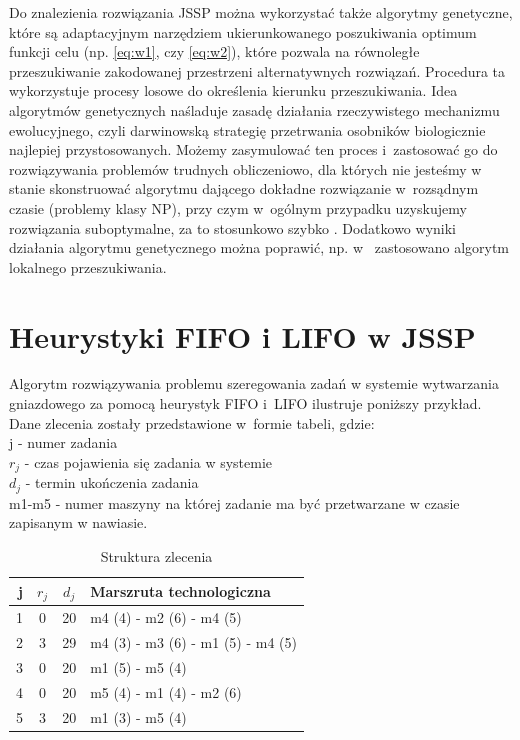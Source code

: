 \documentclass[twoside]{kInzynierka}
\begin{document}
Do znalezienia rozwiązania JSSP można wykorzystać także algorytmy genetyczne, które są adaptacyjnym narzędziem ukierunkowanego poszukiwania optimum funkcji celu (np. \eqref{eq:w1}, czy \eqref{eq:w2}), które pozwala na równoległe przeszukiwanie zakodowanej przestrzeni alternatywnych rozwiązań. Procedura ta wykorzystuje procesy losowe do określenia kierunku przeszukiwania. Idea algorytmów genetycznych naśladuje zasadę działania rzeczywistego mechanizmu ewolucyjnego, czyli darwinowską strategię przetrwania osobników biologicznie najlepiej przystosowanych. Możemy zasymulować ten proces i~zastosować go do rozwiązywania problemów trudnych obliczeniowo, dla których nie jesteśmy w stanie skonstruować algorytmu dającego dokładne rozwiązanie w~rozsądnym czasie (problemy klasy NP), przy czym w~ogólnym przypadku uzyskujemy rozwiązania suboptymalne, za to stosunkowo szybko \cite{grzechca}. Dodatkowo wyniki działania algorytmu genetycznego można poprawić, np. w~\cite{genetyczne} zastosowano algorytm lokalnego przeszukiwania.

\section        {Heurystyki FIFO i LIFO w JSSP}
Algorytm rozwiązywania problemu szeregowania zadań w systemie wytwarzania gniazdowego za pomocą heurystyk FIFO i~LIFO ilustruje poniższy przykład. Dane zlecenia zostały przedstawione w~formie tabeli, gdzie: \\
j - numer zadania \\
\(r_j\) - czas pojawienia się zadania w systemie \\
\(d_j\) - termin ukończenia zadania \\
m1-m5 - numer maszyny na której zadanie ma być przetwarzane w czasie zapisanym w nawiasie.
\begin{table}[htb]
	\centering
	\caption{Struktura zlecenia}
	\begin{tabular}{ | r | c | c | l | }
	\hline
	j	& \(r_j\)	& \(d_j\)	& Marszruta technologiczna	\\ \hline
	1	& 0	& 20	& m4 (4) - m2 (6) - m4 (5)	\\ \hline
	2	& 3	& 29	& m4 (3) - m3 (6) - m1 (5) - m4 (5)	\\ \hline
	3	& 0	& 20	& m1 (5) - m5 (4)	\\ \hline
	4	& 0	& 20	& m5 (4) - m1 (4) - m2 (6)	\\ \hline
	5	& 3	& 20	& m1 (3) - m5 (4)	\\ \hline
	\end{tabular}
\end{table}
\end{document}
